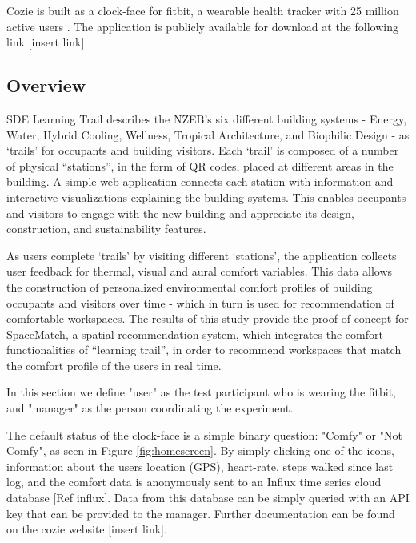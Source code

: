 
Cozie is built as a clock-face for fitbit, a wearable health tracker with 25 million active users \cite{fibit2018}. The application is publicly available for download at the following link [insert link]

\subsection{Overview}


SDE Learning Trail describes the NZEB's six different building systems - Energy, Water, Hybrid Cooling, Wellness, Tropical Architecture, and Biophilic Design - as ‘trails’ for occupants and building visitors. Each ‘trail’ is composed of a number of physical “stations”, in the form of QR codes, placed at different areas in the building. A simple web application connects each station with information and interactive visualizations explaining the building systems. This enables occupants and visitors to engage with the new building and appreciate its design, construction, and sustainability features. 
 
As users complete ‘trails’ by visiting different ‘stations’, the application collects user feedback for thermal, visual and aural comfort variables. This data allows the construction of personalized environmental comfort profiles of building occupants and visitors over time - which in turn is used for recommendation of comfortable workspaces. The results of this study provide the proof of concept for SpaceMatch, a spatial recommendation system, which integrates the comfort functionalities of “learning trail”, in order to recommend workspaces that match the comfort profile of the users in real time. 


In this section we define "user" as the test participant who is wearing the fitbit, and "manager" as the person coordinating the experiment. \ 

The default status of the clock-face is a simple binary question: "Comfy" or "Not Comfy", as seen in Figure \ref{fig:homescreen}. By simply clicking one of the icons, information about the users location (GPS), heart-rate, steps walked since last log, and the comfort data is anonymously sent to an Influx time series cloud database [Ref influx]. Data from this database can be simply queried with an API key that can be provided to the manager. Further documentation can be found on the cozie website [insert link].\\

